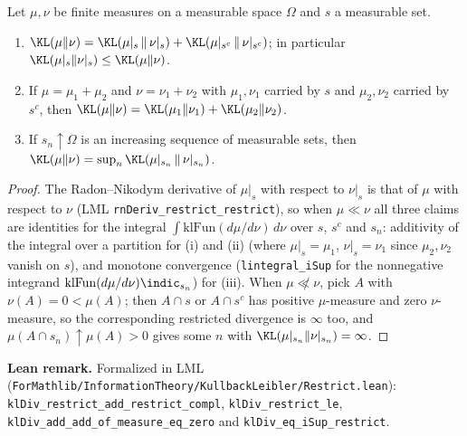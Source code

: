 \begin{lemma}\label{lem:pinfo_kl_restrict}
\leanok
Let $\mu, \nu$ be finite measures on a measurable space $\Omega$ and $s$ a measurable set.
\begin{enumerate}
  \item[(i)] $\KL(\mu\|\nu) = \KL(\mu|_s\,\|\,\nu|_s) + \KL(\mu|_{s^c}\,\|\,\nu|_{s^c})$; in
        particular $\KL(\mu|_s\|\nu|_s) \le \KL(\mu\|\nu)$.
  \item[(ii)] If $\mu = \mu_1 + \mu_2$ and $\nu = \nu_1 + \nu_2$ with $\mu_1, \nu_1$ carried by
        $s$ and $\mu_2, \nu_2$ carried by $s^c$, then $\KL(\mu\|\nu) = \KL(\mu_1\|\nu_1) + \KL(\mu_2\|\nu_2)$.
  \item[(iii)] If $s_n \uparrow \Omega$ is an increasing sequence of measurable sets, then
        $\KL(\mu\|\nu) = \sup_n \KL(\mu|_{s_n}\,\|\,\nu|_{s_n})$.
\end{enumerate}
\end{lemma}

\begin{proof}
\leanok
The Radon--Nikodym derivative of $\mu|_s$ with respect to $\nu|_s$ is that of $\mu$ with
respect to $\nu$ (LML \texttt{rnDeriv\_restrict\_restrict}), so when $\mu \ll \nu$ all three
claims are identities for the integral $\int \mathrm{klFun}(d\mu/d\nu)\,d\nu$ over $s$, $s^c$ and
$s_n$: additivity of the integral over a partition for (i) and (ii) (where
$\mu|_s = \mu_1$, $\nu|_s = \nu_1$ since $\mu_2, \nu_2$ vanish on $s$), and monotone convergence
(\texttt{lintegral\_iSup} for the nonnegative integrand $\mathrm{klFun}(d\mu/d\nu)\indic_{s_n}$)
for (iii). When $\mu \not\ll \nu$, pick $A$ with $\nu(A) = 0 < \mu(A)$; then $A \cap s$ or
$A \cap s^c$ has positive $\mu$-measure and zero $\nu$-measure, so the corresponding restricted
divergence is $\infty$ too, and $\mu(A \cap s_n) \uparrow \mu(A) > 0$ gives some $n$ with
$\KL(\mu|_{s_n}\|\nu|_{s_n}) = \infty$.
\end{proof}

\textbf{Lean remark.} Formalized in LML
(\texttt{ForMathlib/InformationTheory/KullbackLeibler/Restrict.lean}):
\texttt{klDiv\_restrict\_add\_restrict\_compl}, \texttt{klDiv\_restrict\_le},
\texttt{klDiv\_add\_add\_of\_measure\_eq\_zero} and \texttt{klDiv\_eq\_iSup\_restrict}.

